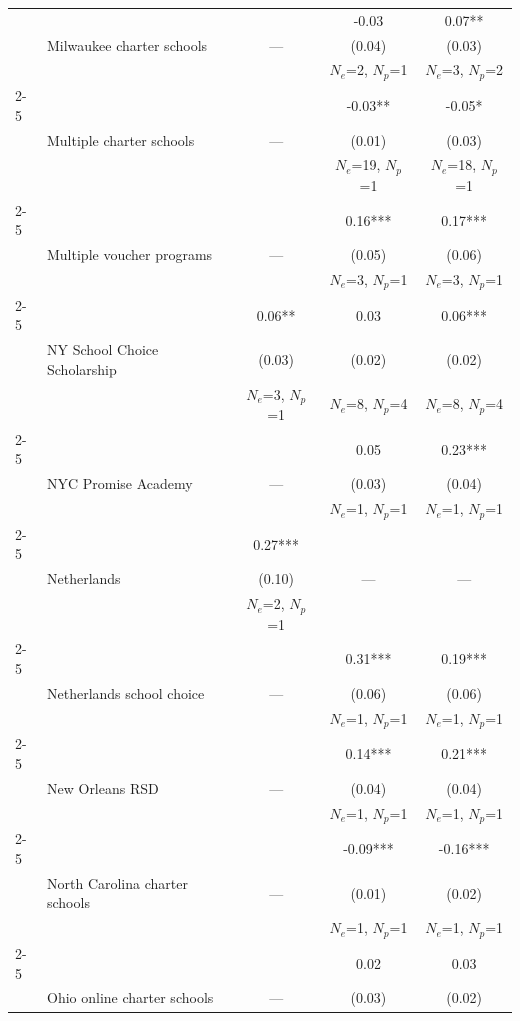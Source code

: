 \begin{longtable}{@{\extracolsep{\fill}} l l c c c @{}}
  &  &  & -0.03 & 0.07** \\
  & Milwaukee charter schools & --- & (0.04) & (0.03) \\
  &  &  & $N_e$=2, $N_p$=1 & $N_e$=3, $N_p$=2 \\
\cmidrule(lr){2-5}
  &  &  & -0.03** & -0.05* \\
  & Multiple charter schools & --- & (0.01) & (0.03) \\
  &  &  & $N_e$=19, $N_p$=1 & $N_e$=18, $N_p$=1 \\
\cmidrule(lr){2-5}
  &  &  & 0.16*** & 0.17*** \\
  & Multiple voucher programs & --- & (0.05) & (0.06) \\
  &  &  & $N_e$=3, $N_p$=1 & $N_e$=3, $N_p$=1 \\
\cmidrule(lr){2-5}
  &  & 0.06** & 0.03 & 0.06*** \\
  & NY School Choice Scholarship & (0.03) & (0.02) & (0.02) \\
  &  & $N_e$=3, $N_p$=1 & $N_e$=8, $N_p$=4 & $N_e$=8, $N_p$=4 \\
\cmidrule(lr){2-5}
  &  &  & 0.05 & 0.23*** \\
  & NYC Promise Academy & --- & (0.03) & (0.04) \\
  &  &  & $N_e$=1, $N_p$=1 & $N_e$=1, $N_p$=1 \\
\cmidrule(lr){2-5}
  &  & 0.27*** &  &  \\
  & Netherlands & (0.10) & --- & --- \\
  &  & $N_e$=2, $N_p$=1 &  &  \\
\cmidrule(lr){2-5}
  &  &  & 0.31*** & 0.19*** \\
  & Netherlands school choice & --- & (0.06) & (0.06) \\
  &  &  & $N_e$=1, $N_p$=1 & $N_e$=1, $N_p$=1 \\
\cmidrule(lr){2-5}
  &  &  & 0.14*** & 0.21*** \\
  & New Orleans RSD & --- & (0.04) & (0.04) \\
  &  &  & $N_e$=1, $N_p$=1 & $N_e$=1, $N_p$=1 \\
\cmidrule(lr){2-5}
  &  &  & -0.09*** & -0.16*** \\
  & North Carolina charter schools & --- & (0.01) & (0.02) \\
  &  &  & $N_e$=1, $N_p$=1 & $N_e$=1, $N_p$=1 \\
\cmidrule(lr){2-5}
  &  &  & 0.02 & 0.03 \\
  & Ohio online charter schools & --- & (0.03) & (0.02) \\

\end{longtable}
